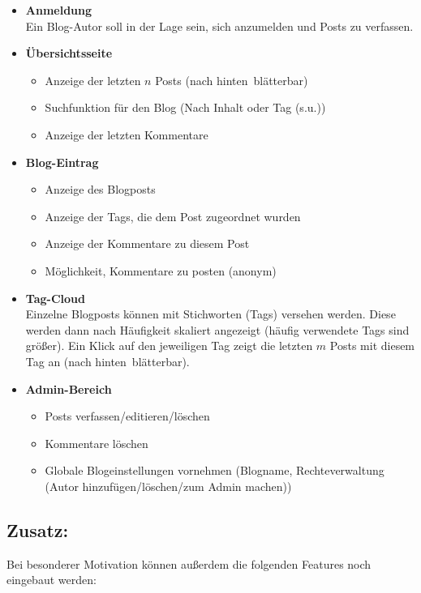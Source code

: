 \documentclass[10pt,a4paper]{article}
\begin{document}
\begin{itemize}
 \item \textbf{Anmeldung}\\
       Ein Blog-Autor soll in der Lage sein, sich anzumelden und Posts zu verfassen.
 \item \textbf{Übersichtsseite}
       \begin{itemize}
        \item Anzeige der letzten $n$ Posts (nach \glqq hinten\grqq \ blätterbar)
        \item Suchfunktion für den Blog (Nach Inhalt oder Tag (s.u.))
        \item Anzeige der letzten Kommentare
       \end{itemize}
 \item \textbf{Blog-Eintrag}
       \begin{itemize}
        \item Anzeige des Blogposts
        \item Anzeige der Tags, die dem Post zugeordnet wurden
        \item Anzeige der Kommentare zu diesem Post
        \item Möglichkeit, Kommentare zu posten (anonym)
       \end{itemize}
 \item \textbf{Tag-Cloud}\\
       Einzelne Blogposts können mit Stichworten (Tags) versehen werden. Diese werden dann nach Häufigkeit skaliert angezeigt (häufig verwendete Tags sind größer). Ein Klick auf den jeweiligen Tag zeigt die letzten $m$ Posts mit diesem Tag an (nach \glqq hinten\grqq \ blätterbar).
 \item \textbf{Admin-Bereich}
       \begin{itemize}
        \item Posts verfassen/editieren/löschen
        \item Kommentare löschen
        \item Globale Blogeinstellungen vornehmen (Blogname, Rechteverwaltung (Autor hinzufügen/löschen/zum Admin machen))
       \end{itemize}
\end{itemize}


\subsection*{Zusatz:}

Bei besonderer Motivation können außerdem die folgenden Features noch eingebaut werden:
\end{document}
